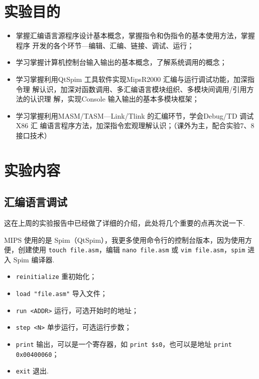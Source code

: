 \documentclass[11pt]{SEU-Digital-Report}
\begin{document}
  \exptitlepage

  \tableofcontents
  \newpage

  \section{实验目的}
    \begin{itemize}
      \item 掌握汇编语言源程序设计基本概念，掌握指令和伪指令的基本使用方法，掌握程序
      开发的各个环节—编辑、汇编、链接、调试、运行；
      \item 学习掌握计算机控制台输入输出的基本概念，了解系统调用的概念；
      \item 学习掌握利用QtSpim 工具软件实现MipsR2000 汇编与运行调试功能，加深指令理
      解认识，加深对函数调用、多汇编语言模块组织、多模块间调用/引用方法的认识理
      解，实现Console 输入输出的基本多模块框架；
      \item 学习掌握利用MASM/TASM—Link/Tlink 的汇编环节，学会Debug/TD 调试X86 汇
      编语言程序方法，加深指令宏观理解认识；（课外为主，配合实验7、8 接口技术）\cite{guide}
    \end{itemize}

  \section{实验内容}

    \subsection{汇编语言调试}

      这在上周的实验报告中已经做了详细的介绍，此处将几个重要的点再次说一下.

      MIPS 使用的是 Spim（QtSpim），我更多使用命令行的控制台版本，因为使用方便，创建使用 \texttt{touch file.asm}，编辑 \texttt{nano file.asm} 或 \texttt{vim file.asm}，\texttt{spim} 进入 Spim 编译器.
      \begin{itemize}
        \item \texttt{reinitialize} 重初始化；
        \item \texttt{load "file.asm"} 导入文件；
        \item \texttt{run <ADDR>} 运行，可选开始时的地址；
        \item \texttt{step <N>} 单步运行，可选运行步数；
        \item \texttt{print} 输出，可以是一个寄存器，如 \texttt{print \$s0}，也可以是地址 \texttt{print 0x00400060}；
        \item \texttt{exit} 退出.
      \end{itemize}
\end{document}
